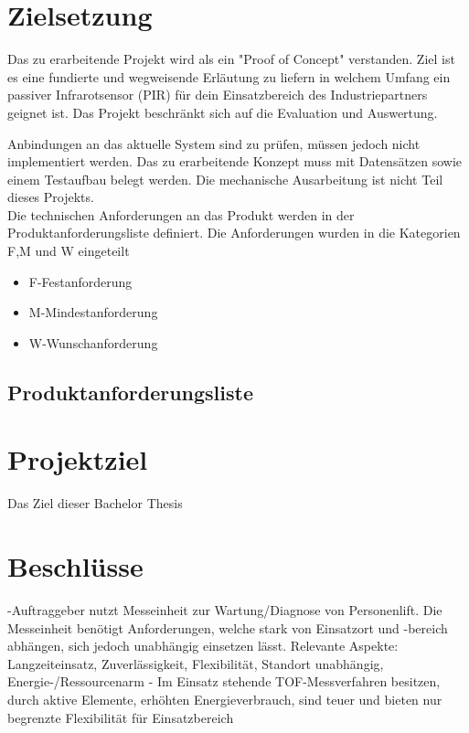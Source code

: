 \section{Zielsetzung}


Das zu erarbeitende Projekt wird als ein "Proof of Concept" verstanden. Ziel ist es eine fundierte und wegweisende Erläutung zu liefern in welchem Umfang ein passiver Infrarotsensor (PIR) für dein Einsatzbereich des Industriepartners geignet ist. 
Das Projekt beschränkt sich auf die Evaluation und Auswertung. 

Anbindungen an das aktuelle System sind zu prüfen, müssen jedoch nicht implementiert werden. Das zu erarbeitende Konzept muss mit Datensätzen sowie einem Testaufbau belegt werden. Die mechanische Ausarbeitung ist nicht Teil dieses Projekts.\\
Die technischen Anforderungen an das Produkt werden in der Produktanforderungsliste definiert. Die Anforderungen wurden in die Kategorien F,M und W eingeteilt\\
\begin{itemize}
	\item F\tab-\tab Festanforderung
	\item M\tab-\tab Mindestanforderung
	\item W\tab-\tab Wunschanforderung
\end{itemize}

\subsection{Produktanforderungsliste}
%

\section{Projektziel}
Das Ziel dieser Bachelor Thesis 



\section{Beschlüsse}

-Auftraggeber nutzt Messeinheit zur Wartung/Diagnose von Personenlift. Die Messeinheit benötigt Anforderungen, welche stark von Einsatzort und -bereich abhängen, sich jedoch unabhängig einsetzen lässt. 
Relevante Aspekte: Langzeiteinsatz, Zuverlässigkeit, Flexibilität, Standort unabhängig, Energie-/Ressourcenarm
-	Im Einsatz stehende TOF-Messverfahren besitzen, durch aktive Elemente, erhöhten Energieverbrauch, sind teuer und bieten nur begrenzte Flexibilität für Einsatzbereich


